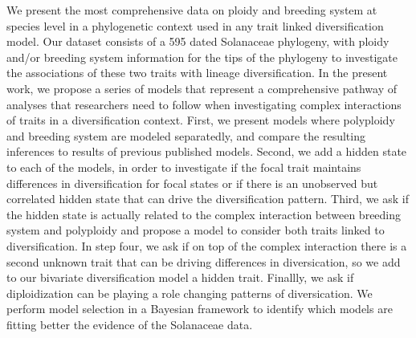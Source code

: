 We present the most comprehensive data on ploidy and breeding system at species level in a phylogenetic context used in any trait linked diversification model. Our dataset consists of  a 595 dated Solanaceae phylogeny, with ploidy and/or breeding system information for the tips of the phylogeny to investigate the associations of these two traits with lineage diversification.
In the present work, we propose a series of models that represent a comprehensive pathway of analyses that researchers need to follow when investigating complex interactions of traits in a diversification context. First, we present models where polyploidy and breeding system are modeled separatedly, and compare the resulting inferences to results of previous published models. Second, we add a hidden state to each of the models, in order to investigate if the focal trait maintains differences in diversification for focal states or if there is an unobserved but correlated hidden state that can drive the diversification pattern. Third, we ask if the hidden state is actually related to the complex interaction between breeding system and polyploidy and propose a model to consider both traits linked to diversification. In step four, we  ask if on top of the complex interaction there is a second unknown trait that can be driving differences in diversication, so we add to our bivariate diversification model a hidden trait.\newline
Finallly, we ask if diploidization can be playing a role changing patterns of diversication. We perform model selection in a Bayesian framework to identify which models are fitting better the evidence of the Solanaceae data.




